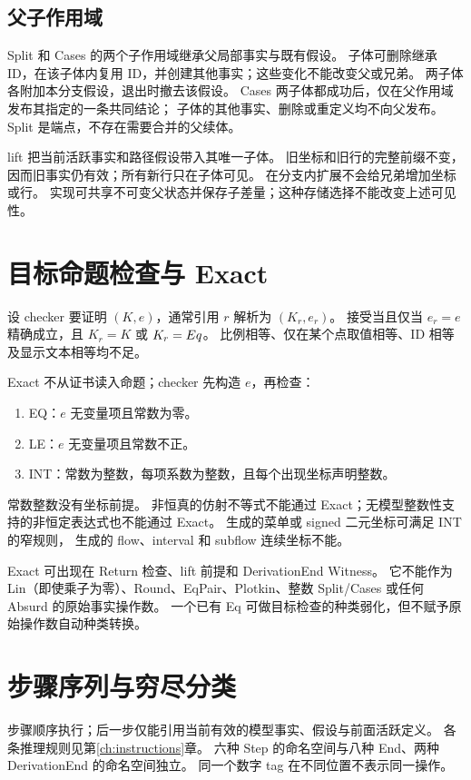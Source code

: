 \subsection{父子作用域}
\label{sec:branch-transactions}

Split 和 Cases 的两个子作用域继承父局部事实与既有假设。
子体可删除继承 ID，在该子体内复用 ID，并创建其他事实；这些变化不能改变父或兄弟。
两子体各附加本分支假设，退出时撤去该假设。
Cases 两子体都成功后，仅在父作用域发布其指定的一条共同结论；
子体的其他事实、删除或重定义均不向父发布。
Split 是端点，不存在需要合并的父续体。

lift 把当前活跃事实和路径假设带入其唯一子体。
旧坐标和旧行的完整前缀不变，因而旧事实仍有效；所有新行只在子体可见。
在分支内扩展不会给兄弟增加坐标或行。
实现可共享不可变父状态并保存子差量；这种存储选择不能改变上述可见性。

\section{目标命题检查与 Exact}
\label{sec:exact-check}

设 checker 要证明 $(K,e)$，通常引用 $r$ 解析为 $(K_r,e_r)$。
接受当且仅当 $e_r=e$ 精确成立，且 $K_r=K$ 或 $K_r=Eq$。
比例相等、仅在某个点取值相等、ID 相等及显示文本相等均不足。

Exact 不从证书读入命题；checker 先构造 $e$，再检查：
\begin{enumerate}
 \item EQ：$e$ 无变量项且常数为零。
 \item LE：$e$ 无变量项且常数不正。
 \item INT：常数为整数，每项系数为整数，且每个出现坐标声明整数。
\end{enumerate}
常数整数没有坐标前提。
非恒真的仿射不等式不能通过 Exact；无模型整数性支持的非恒定表达式也不能通过 Exact。
生成的菜单或 signed 二元坐标可满足 INT 的窄规则，
生成的 flow、interval 和 subflow 连续坐标不能。

Exact 可出现在 Return 检查、lift 前提和 DerivationEnd Witness。
它不能作为 Lin（即使乘子为零）、Round、EqPair、Plotkin、整数 Split/Cases
或任何 Absurd 的原始事实操作数。
一个已有 Eq 可做目标检查的种类弱化，但不赋予原始操作数自动种类转换。

\section{步骤序列与穷尽分类}

步骤顺序执行；后一步仅能引用当前有效的模型事实、假设与前面活跃定义。
各条推理规则见第\ref{ch:instructions}章。
六种 Step 的命名空间与八种 End、两种 DerivationEnd 的命名空间独立。
同一个数字 tag 在不同位置不表示同一操作。

